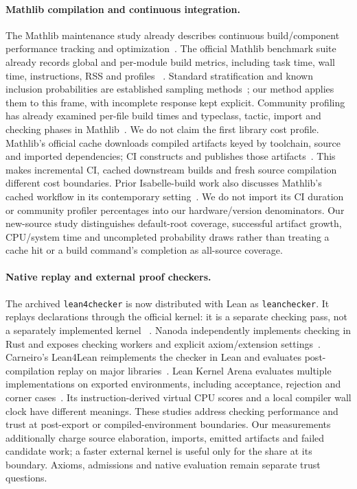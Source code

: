 \documentclass[10pt,twocolumn]{article}
\begin{document}
\paragraph{Mathlib compilation and continuous integration.}
The Mathlib maintenance study already describes continuous build/component
performance tracking and optimization~\cite{growingMathlib2025}.
The official Mathlib benchmark suite already records global and per-module
build metrics, including task time, wall time, instructions, RSS and profiles
~\cite{mathlibBench2026}. Standard stratification and known inclusion
probabilities are established sampling methods~\cite{samplingStatCan}; our
method applies them to this frame, with incomplete response kept explicit.
Community profiling has already examined per-file build times and
typeclass, tactic, import and checking phases in Mathlib~\cite{stollMathlib2024}.
We do not claim the first library cost profile.
Mathlib's official cache downloads compiled artifacts keyed by toolchain,
source and imported dependencies; CI constructs and publishes those
artifacts~\cite{mathlibCache2026}.
This makes incremental CI, cached downstream builds and fresh source
compilation different cost boundaries.
Prior Isabelle-build work also discusses Mathlib's cached workflow in its
contemporary setting~\cite{isabelleBuild2024}.
We do not import its CI duration or community profiler percentages into our
hardware/version denominators.
Our new-source study distinguishes default-root coverage, successful artifact
growth, CPU/system time and uncompleted probability draws rather than
treating a cache hit or a build command's completion as all-source coverage.

\paragraph{Native replay and external proof checkers.}
The archived \texttt{lean4checker} is now distributed with Lean as
\texttt{leanchecker}. It replays declarations through the official kernel:
it is a separate checking pass, not a separately implemented kernel
~\cite{leanCheckerDocs}.
Nanoda independently implements checking in Rust and exposes checking workers
and explicit axiom/extension settings~\cite{nanoda2026}.
Carneiro's Lean4Lean reimplements the checker in Lean and evaluates
post-compilation replay on major libraries~\cite{lean4lean2025}.
Lean Kernel Arena evaluates multiple implementations on exported environments,
including acceptance, rejection and corner cases~\cite{leanArena}.
Its instruction-derived virtual CPU scores and a local compiler wall clock
have different meanings.
These studies address checking performance and trust at post-export or
compiled-environment boundaries. Our measurements additionally charge
source elaboration, imports, emitted artifacts and failed candidate work;
a faster external kernel is useful only for the share at its boundary.
Axioms, admissions and native evaluation remain separate trust questions.
\end{document}
